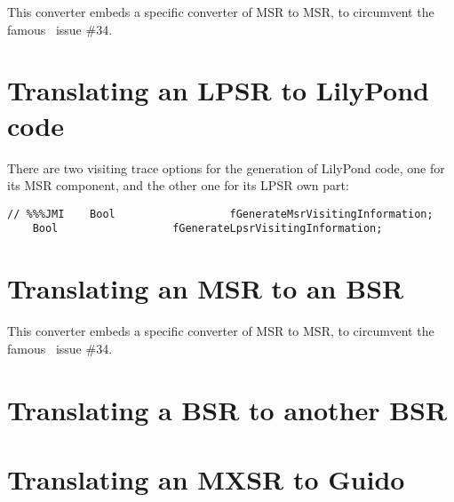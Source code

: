 This converter embeds a specific converter of MSR to MSR, to circumvent the famous \lily\ issue \#34.


\section{Translating an LPSR to LilyPond code}




There are two visiting trace options for the generation of LilyPond code, one for its MSR component, and the other one for its LPSR own part:
\begin{lstlisting}[language=CPlusPlus]
// %%%JMI    Bool                  fGenerateMsrVisitingInformation;
    Bool                  fGenerateLpsrVisitingInformation;
\end{lstlisting}


\section{Translating an MSR to an BSR}

This converter embeds a specific converter of MSR to MSR, to circumvent the famous \lily\ issue \#34.


\section{Translating a BSR to another BSR}


\section{Translating an MXSR to Guido}


